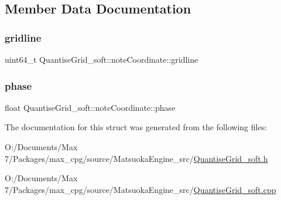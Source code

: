 \subsection{Member Data Documentation}
\mbox{\label{structQuantiseGrid__soft_1_1noteCoordinate_a21b822d390f01aba9aa1fed2d5cc8a08}} 
\subsubsection{\texorpdfstring{gridline}{gridline}}
{\footnotesize\ttfamily uint64\+\_\+t Quantise\+Grid\+\_\+soft\+::note\+Coordinate\+::gridline}

\mbox{\label{structQuantiseGrid__soft_1_1noteCoordinate_aee66a62adac6ba5afdd8a20fa28bf2be}} 
\subsubsection{\texorpdfstring{phase}{phase}}
{\footnotesize\ttfamily float Quantise\+Grid\+\_\+soft\+::note\+Coordinate\+::phase}



The documentation for this struct was generated from the following files\+:\begin{DoxyCompactItemize}
\item 
O\+:/\+Documents/\+Max 7/\+Packages/max\+\_\+cpg/source/\+Matsuoka\+Engine\+\_\+src/\mbox{\hyperlink{QuantiseGrid__soft_8h}{Quantise\+Grid\+\_\+soft.\+h}}\item 
O\+:/\+Documents/\+Max 7/\+Packages/max\+\_\+cpg/source/\+Matsuoka\+Engine\+\_\+src/\mbox{\hyperlink{QuantiseGrid__soft_8cpp}{Quantise\+Grid\+\_\+soft.\+cpp}}\end{DoxyCompactItemize}
